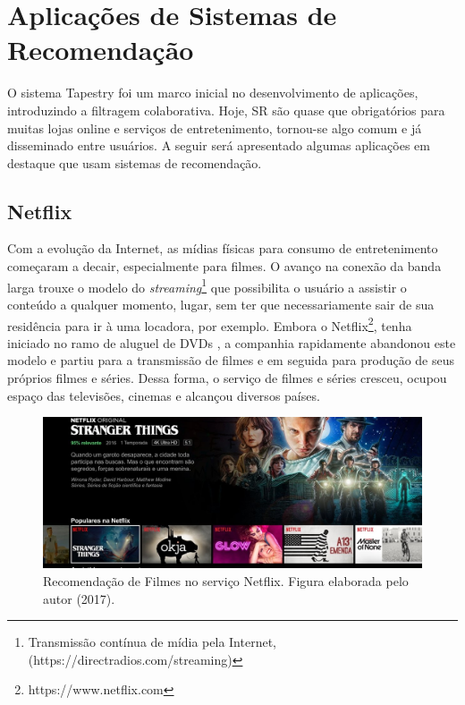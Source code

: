 \section{Aplicações de Sistemas de Recomendação}

O sistema Tapestry \citep{Goldberg:1992:UCF:138859.138867} foi um marco inicial no desenvolvimento de aplicações, introduzindo a filtragem colaborativa. Hoje, SR são quase que obrigatórios para muitas lojas online e serviços de entretenimento, tornou-se algo comum e já disseminado entre usuários. A seguir será apresentado algumas aplicações em destaque que usam sistemas de recomendação.

\subsection{Netflix}

Com a evolução da Internet, as mídias físicas para consumo de entretenimento começaram a decair, especialmente para filmes. O avanço na conexão da banda larga trouxe o modelo do \textit{streaming}\footnote{Transmissão contínua de mídia pela Internet, (https://directradios.com/streaming)} que possibilita o usuário a assistir o conteúdo a qualquer momento, lugar, sem ter que  necessariamente sair de sua residência para ir à uma locadora, por exemplo. Embora o Netflix\footnote{https://www.netflix.com}, tenha iniciado no ramo de aluguel de \ac{DVD}s \citep{keating2012netflixed}, a companhia rapidamente abandonou este modelo e partiu para a transmissão de filmes e em seguida para produção de seus próprios filmes e séries. Dessa forma, o serviço de filmes e séries cresceu, ocupou espaço das televisões, cinemas e alcançou diversos países.

\begin{figure}
	\centering
	\includegraphics[scale=0.40]{imagens/netflix_recsys.jpg}
	\caption{Recomendação de Filmes no serviço Netflix. Figura elaborada pelo autor (2017).}
	\label{fig:netflix}
\end{figure}

